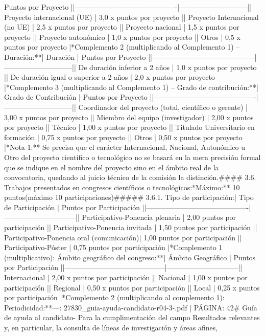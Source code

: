 \documentclass{article}
\begin{document}
\begin{itemize}
{{{{{Puntos por Proyecto         |\n|-------------------------------------------|-----------------------------|\n| Proyecto internacional (UE)               | 3,0 x puntos por proyecto    |\n| Proyecto Internacional (no UE)            | 2,5 x puntos por proyecto    |\n| Proyecto nacional                          | 1,5 x puntos por proyecto    |\n| Proyecto autonómico                        | 1,0 x puntos por proyecto    |\n| Otros                                     | 0,5 x puntos por proyecto    |\n\n**Complemento 2 (multiplicando al Complemento 1) – Duración:**\n\n| Duración                                   | Puntos por Proyecto         |\n|-------------------------------------------|-----------------------------|\n| De duración inferior a 2 años             | 1,0 x puntos por proyecto    |\n| De duración igual o superior a 2 años     | 2,0 x puntos por proyecto    |\n\n**Complemento 3 (multiplicando al Complemento 1) – Grado de contribución:**\n\n| Grado de Contribución                     | Puntos por Proyecto         |\n|-------------------------------------------|-----------------------------|\n| Coordinador del proyecto (total, científico o gerente) | 3,00 x puntos por proyecto |\n| Miembro del equipo (investigador)        | 2,00 x puntos por proyecto    |\n| Técnico                                   | 1,00 x puntos por proyecto    |\n| Titulado Universitario en formación       | 0,75 x puntos por proyecto    |\n| Otros                                     | 0,50 x puntos por proyecto    |\n\n**Nota 1:** Se precisa que el carácter Internacional, Nacional, Autonómico u Otro del proyecto científico o tecnológico no se basará en la mera precisión formal que se indique en el nombre del proyecto sino en el ámbito real de la convocatoria, quedando al juicio técnico de la comisión la distinción.\n\n#### 3.6. Trabajos presentados en congresos científicos o tecnológicos:\n**Máximo:** 10 puntos\n(máximo 10 participaciones)\n\n##### 3.6.1. Tipo de participación:\n\n| Tipo de Participación                     | Puntos por Participación     |\n|-------------------------------------------|------------------------------|\n| Participativo-Ponencia plenaria           | 2,00 puntos por participación  |\n| Participativo-Ponencia invitada           | 1,50 puntos por participación  |\n| Participativo-Ponencia oral (comunicación)| 1,00 puntos por participación  |\n| Participativo-Póster                      | 0,75 puntos por participación  |\n\n**Complemento 1 (multiplicativo): Ámbito geográfico del congreso:**\n\n| Ámbito Geográfico                        | Puntos por Participación     |\n|------------------------------------------|------------------------------|\n| Internacional                            | 2,00 x puntos por participación |\n| Nacional                                 | 1,00 x puntos por participación |\n| Regional                                 | 0,50 x puntos por participación |\n| Local                                    | 0,25 x puntos por participación |\n\n**Complemento 2 (multiplicando al complemento 1): Periodicidad:**\n\n---\n\nFUENTE: 27830_guia-ayuda-candidato-r04-3-.pdf | PÁGINA: 42\n# Guía de ayuda al candidato\n\n- Para la cumplimentación del campo Resultados relevantes y, en particular, la consulta de líneas de investigación y áreas afines, }}}}}
\end{itemize}
\end{document}
